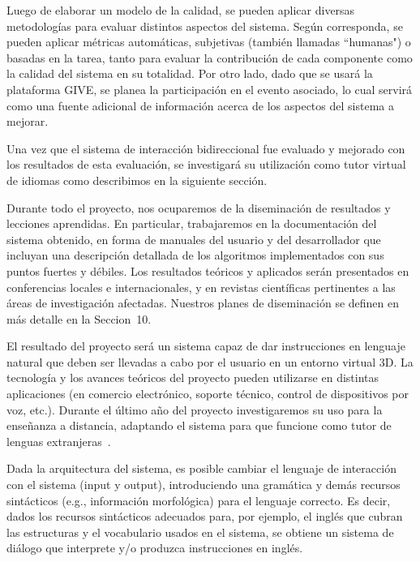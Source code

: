 Luego de elaborar un modelo de la calidad, se pueden aplicar diversas
metodolog\'ias para evaluar distintos aspectos del sistema. Seg\'un corresponda, se
pueden aplicar m\'etricas autom\'aticas, subjetivas (tambi\'en llamadas
``humanas") o basadas en la tarea, tanto para evaluar la contribuci\'on de cada
componente como la calidad del sistema en su totalidad.
Por otro lado, dado que se usar\'a la plataforma GIVE, se planea la
participaci\'on en el evento asociado, lo cual servir\'a como una fuente
adicional de informaci\'on acerca de los aspectos del sistema a mejorar.

Una vez que el sistema de interacci\'on bidireccional fue evaluado y mejorado
con los resultados de esta evaluaci\'on,
se investigar\'a su utilizaci\'on
como tutor virtual de idiomas como describimos en la siguiente secci\'on.


Durante todo el proyecto, nos ocuparemos de la diseminaci\'on de resultados y
lecciones aprendidas.  En particular, trabajaremos en la documentaci\'on del
sistema obtenido, en forma de manuales del usuario y del desarrollador que
incluyan una descripci\'on detallada de los algoritmos implementados con sus
puntos fuertes y d\'ebiles.
Los resultados te\'oricos y aplicados ser\'an presentados en conferencias locales e internacionales,
y en revistas cient\'ificas pertinentes a las \'areas de
investigaci\'on afectadas.  Nuestros
planes de diseminaci\'on se definen en m\'as detalle en la Seccion~10.




El resultado del proyecto ser\'a un sistema capaz de dar instrucciones
en lenguaje natural que deben ser llevadas a cabo por el usuario en un
entorno virtual 3D.  La tecnolog\'ia y los avances te\'oricos del proyecto
pueden utilizarse en distintas aplicaciones (en comercio electr\'onico,
soporte t\'ecnico, control de dispositivos por voz, etc.).  Durante el
\'ultimo a\~no del proyecto investigaremos su uso para la ense\~nanza a
distancia, adaptando el sistema para que funcione como tutor de lenguas
extranjeras~\citep{Eskenazi09,Wik09}.

Dada la arquitectura del sistema, es posible cambiar el lenguaje de
interacci\'on con el sistema (input y output), introduciendo
una gram\'atica y dem\'as recursos sint\'acticos (e.g., informaci\'on
morfol\'ogica) para el lenguaje correcto.  Es decir, dados los recursos
sint\'acticos adecuados para, por ejemplo, el ingl\'es que cubran las
estructuras y el vocabulario usados en el sistema, se obtiene un sistema
de di\'alogo que interprete y/o produzca instrucciones en ingl\'es.


